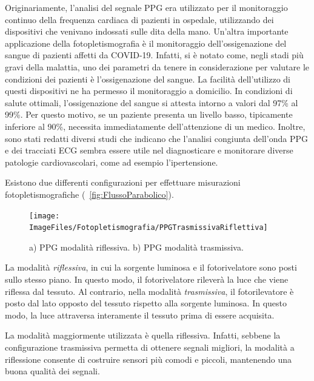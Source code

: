 Originariamente, l'analisi del segnale PPG era utilizzato per il monitoraggio continuo della frequenza cardiaca di pazienti in ospedale, utilizzando dei dispositivi che venivano indossati sulle dita della mano. Un'altra importante applicazione della fotopletismografia è il monitoraggio dell'ossigenazione del sangue di pazienti affetti da COVID-19. Infatti, si è notato come, negli stadi più gravi della malattia, uno dei parametri da tenere in considerazione per valutare le condizioni dei pazienti è l'ossigenazione del sangue. La facilità dell'utilizzo di questi dispositivi ne ha permesso il monitoraggio a domicilio. In condizioni di salute ottimali, l'ossigenazione del sangue si attesta intorno a valori dal 97\% al 99\%. Per questo motivo, se un paziente presenta un livello basso, tipicamente inferiore al 90\%, necessita immediatamente dell'attenzione di un medico. Inoltre, sono stati redatti diversi studi che indicano che l'analisi congiunta dell'onda PPG e dei tracciati ECG sembra essere utile nel diagnosticare e monitorare diverse patologie cardiovascolari, come ad esempio l'ipertensione\cite{Elgendi2019}. 

Esistono due differenti configurazioni per effettuare misurazioni fotopletismografiche (\Fig~\ref{fig:FlussoParabolico}).
\begin{figure}[tb]
	\centering
	\texttt{[image: ImageFiles/Fotopletismografia/PPGTrasmissivaRiflettiva]}
	\caption{a) PPG modalità riflessiva. b) PPG modalità trasmissiva.}
	\label{fig:PPGTrasmissivaRiflettiva}
\end{figure}

La modalità \textit{riflessiva}, in cui la sorgente luminosa e il fotorivelatore sono posti sullo stesso piano. In questo modo, il fotorivelatore rileverà la luce che viene riflessa dal tessuto. Al contrario, nella modalità \textit{trasmissiva}, il fotorilevatore è posto dal lato opposto del tessuto rispetto alla sorgente luminosa. In questo modo, la luce attraversa interamente il tessuto prima di essere acquisita. 

La modalità maggiormente utilizzata è quella riflessiva.  Infatti, sebbene la configurazione trasmissiva permetta di ottenere segnali migliori, la modalità a riflessione consente di costruire sensori più comodi e piccoli, mantenendo una buona qualità dei segnali.

